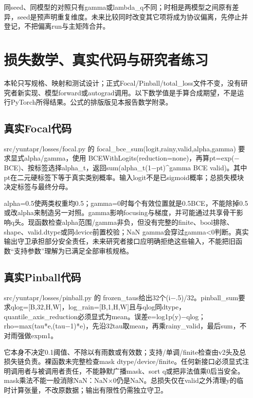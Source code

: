 \documentclass[UTF8,fontset=fandol,10pt]{ctexart}
\begin{document}
同seed、同模型的对照只有gamma或lambda\_\allowbreak{}q不同；时相是两模型之间原有差异，seed是预声明重复维度。未来比较同时改变其它项将成为协议偏离，先停止并登记，不把偏离run与主矩阵合并。
\clearpage\section{损失数学、真实代码与研究者练习}

本轮只写规格、映射和测试设计；正式Focal/\allowbreak{}Pinball/\allowbreak{}total\_\allowbreak{}loss文件不变，没有研究者新实现、模型forward或autograd调用。以下数学值是手算合成期望，不是运行PyTorch所得结果。公式的排版版见本报告数学附录。

\subsection{真实Focal代码}

src/\allowbreak{}yuntapr/\allowbreak{}losses/\allowbreak{}focal.py 的 focal\_\allowbreak{}bce\_\allowbreak{}sum(logit,rainy,valid,alpha,gamma) 要求显式alpha/\allowbreak{}gamma，使用 BCEWithLogits(reduction=none)，再算pt=exp(\(-\)BCE)、按标签选择alpha\_\allowbreak{}t，返回sum(alpha\_\allowbreak{}t(1\(-\)pt)\textasciicircum{}gamma BCE valid)。其中pt在二元硬标签下等于真实类别概率。输入logit不是已sigmoid概率；总损失模块决定标签与最终分母。

alpha=0.5使两类权重均0.5；gamma=0时每个有效位置就是0.5BCE，不能除掉0.5或改alpha来制造另一对照。gamma影响focusing与梯度，并可能通过共享骨干影响q头。现函数检查alpha范围/\allowbreak{}gamma非负，但没有完整的finite、bool排除、shape、valid.dtype或同device前置校验；NaN gamma会穿过gamma<0判断。真实输出守卫承担部分安全责任，未来研究者接口应明确拒绝这些输入，不能把旧函数“支持参数”理解为已满足全部审核规格。

\subsection{真实Pinball代码}

src/\allowbreak{}yuntapr/\allowbreak{}losses/\allowbreak{}pinball.py 的 frozen\_\allowbreak{}taus给出32个(i\(-\).5)/\allowbreak{}32。pinball\_\allowbreak{}sum要求qlog=[B,32,H,W]，log\_\allowbreak{}rain=[B,1,H,W]且与qlog同dtype，quantile\_\allowbreak{}axis\_\allowbreak{}reduction必须显式为mean。误差e=log1p(y)\(-\)qlog；rho=max(tau*e,(tau\(-\)1)*e)，先沿32tau取mean，再乘rainy\_\allowbreak{}valid，最后sum，不对雨强做expm1。

它本身不决定0.1阈值、不除以有雨数或有效数；支持/\allowbreak{}单调/\allowbreak{}finite检查由v2头及总损失链负责。裸函数未完整检查mask dtype/\allowbreak{}device/\allowbreak{}finite。任何新接口必须显式注明调用者与被调用者责任，不能静默广播mask、sort q或把非法值乘0后当安全。mask乘法不能一般消除NaN：NaN\(\times\)0仍是NaN。总损失仅在valid之外清理y的临时计算张量，不改原数据；输出有限性仍需独立守卫。
\end{document}
